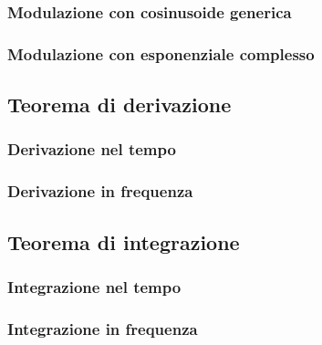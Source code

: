 \documentclass[12pt,oneside,openany]{memoir}
\numberwithin{equation}{subsection}
\begin{document}
\newpage
\subsubsection{Modulazione con cosinusoide generica}


\newpage
\subsubsection{Modulazione con esponenziale complesso}


\newpage
\subsection{Teorema di derivazione}
\newpage
\subsubsection{Derivazione nel tempo}
\newpage
\subsubsection{Derivazione in frequenza}


\newpage
\subsection{Teorema di integrazione}
\newpage
\subsubsection{Integrazione nel tempo}
\newpage
\subsubsection{Integrazione in frequenza}

\end{document}
